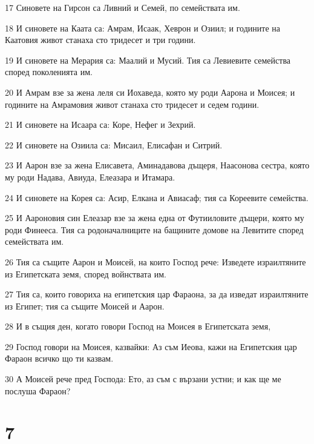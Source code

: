 \par 17 Синовете на Гирсон са Ливний и Семей, по семействата им.
\par 18 И синовете на Каата са: Амрам, Исаак, Хеврон и Озиил; и годините на Каатовия живот станаха сто тридесет и три години.
\par 19 И синовете на Мерария са: Маалий и Мусий. Тия са Левиевите семейства според поколенията им.
\par 20 И Амрам взе за жена леля си Иохаведа, която му роди Аарона и Моисея; и годините на Амрамовия живот станаха сто тридесет и седем години.
\par 21 И синовете на Исаара са: Коре, Нефег и Зехрий.
\par 22 И синовете на Озиила са: Мисаил, Елисафан и Ситрий.
\par 23 И Аарон взе за жена Елисавета, Аминадавова дъщеря, Наасонова сестра, която му роди Надава, Авиуда, Елеазара и Итамара.
\par 24 И синовете на Корея са: Асир, Елкана и Авиасаф; тия са Кореевите семейства.
\par 25 И Аароновия син Елеазар взе за жена една от Футииловите дъщери, която му роди Финееса. Тия са родоначалниците на бащините домове на Левитите според семействата им.
\par 26 Тия са същите Аарон и Моисей, на които Господ рече: Изведете израилтяните из Египетската земя, според войнствата им.
\par 27 Тия са, които говориха на египетския цар Фараона, за да изведат израилтяните из Египет; тия са същите Моисей и Аарон.
\par 28 И в същия ден, когато говори Господ на Моисея в Египетската земя,
\par 29 Господ говори на Моисея, казвайки: Аз съм Иеова, кажи на Египетския цар Фараон всичко що ти казвам.
\par 30 А Моисей рече пред Господа: Ето, аз съм с вързани устни; и как ще ме послуша Фараон?

\chapter{7}

